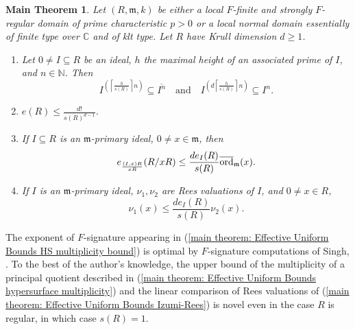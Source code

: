 \documentclass[12pt]{amsart}
\numberwithin{equation}{theorem}
\theoremstyle{plain}
\newtheorem{maintheorem}{Main Theorem}
\newcommand{\fm}{\mathfrak{m}}
\newcommand{\QQ}{\mathbb{Q}}
\newcommand{\CC}{\mathbb{C}}
\newcommand{\NN}{\mathbb{N}}
\begin{document}
\begin{maintheorem}
    \label{main theorem: Effective Uniform Bounds}
    Let $(R,\fm,k)$ be either a local $F$-finite and strongly $F$-regular domain of prime characteristic $p>0$ or a local normal domain essentially of finite type over $\CC$ and of klt type. Let $R$ have Krull dimension $d\geq 1$.
    \begin{enumerate}
        \item\label{main theorem: Effective Uniform Bounds USTP} Let $0\not=I\subseteq R$ be an ideal, $h$ the maximal height of an associated prime of $I$, and $n\in\NN$. Then
        \[
        I^{\left(\left\lceil\frac{h}{s(R)}\right\rceil n\right)}\subseteq \overline{I^n} \quad \mbox{and} \quad I^{\left(d\left\lceil\frac{h}{s(R)}\right\rceil n\right)}\subseteq I^n.
        \]
        \item\label{main theorem: Effective Uniform Bounds HS multiplicity bound} $e(R)\leq \frac{d!}{s(R)^{d-1}}$.
        \item\label{main theorem: Effective Uniform Bounds hypersurface multiplicity} If $I\subseteq R$ is an $\fm$-primary ideal, $0\not=x\in \fm$, then
        \[
        e_{\frac{(I,x)R}{xR}}(R/xR)\leq \frac{de_I(R)}{s(R)}\overline{\ord}_{\fm}(x).
        \]
        \item\label{main theorem: Effective Uniform Bounds Izumi-Rees} If $I$ is an $\fm$-primary ideal, $\nu_1,\nu_2$ are Rees valuations of $I$, and $0\not=x\in R$,
        \[
        \nu_1(x)\leq \frac{de_I(R)}{s(R)}\nu_2(x).
        \]
    \end{enumerate}
\end{maintheorem}


\begin{remark}
    The exponent of $F$-signature appearing in (\ref{main theorem: Effective Uniform Bounds HS multiplicity bound}) is optimal by $F$-signature computations of Singh, \cite{Singh2005}. To the best of the author's knowledge, the upper bound of the multiplicity of a principal quotient described in (\ref{main theorem: Effective Uniform Bounds hypersurface multiplicity}) and the linear comparison of Rees valuations of (\ref{main theorem: Effective Uniform Bounds Izumi-Rees}) is novel even in the case $R$ is regular, in which case $s(R) = 1$.
\end{remark}
\end{document}
